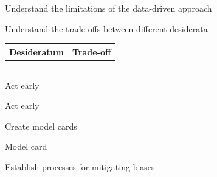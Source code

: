 \begin{frame}{Understand the limitations of the data-driven approach}
  \begin{withmargin}
    \begin{tdmain}
    \end{tdmain}
    \begin{tdmargin}
    \end{tdmargin}
  \end{withmargin}
\end{frame}

\begin{frame}{Understand the trade-offs between different desiderata}
  \footnotesize
  \renewcommand{\arraystretch}{1.35}
  \begin{tabular}{@{}%
    >{\raggedright\arraybackslash}p{}%
    >{\raggedright\arraybackslash}p{}@{}}
    \toprule
    \textbf{Desideratum} & \textbf{Trade-off}\\
    \midrule
     & \\
     & \\
     & \\
    \bottomrule
  \end{tabular}
\end{frame}

\begin{frame}{Act early}
  \begin{tdblockt}{Act early}
  \end{tdblockt}
  \begin{takeaway}
  \end{takeaway}
\end{frame}

\begin{frame}{Create model cards}
  \begin{tdcodet}{Model card}
  \end{tdcodet}
\end{frame}

\begin{frame}{Establish processes for mitigating biases}
  \begin{withmargin}
    \begin{tdmain}
    \end{tdmain}
    \begin{tdmargin}
    \end{tdmargin}
  \end{withmargin}
\end{frame}

